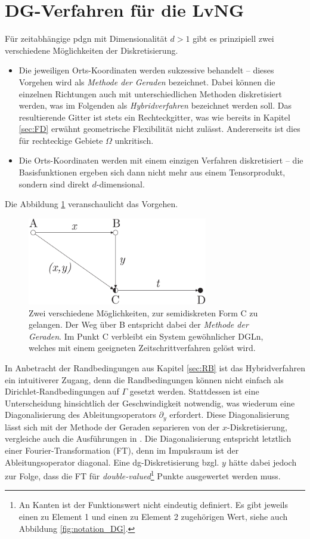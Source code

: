 \section{DG-Verfahren für die LvNG}\label{sec:primal}
Für zeitabhängige \ac{pdg}n mit Dimensionalität $d>1$ gibt es prinzipiell zwei verschiedene Möglichkeiten der Diskretisierung.
\begin{itemize}
  \item Die jeweiligen Orts-Koordinaten werden sukzessive behandelt -- dieses Vorgehen wird als \emph{Methode der Geraden} bezeichnet. Dabei können die einzelnen Richtungen auch mit unterschiedlichen Methoden diskretisiert werden, was im Folgenden als \emph{Hybridverfahren} bezeichnet werden soll. Das resultierende Gitter ist stets ein Rechteckgitter, was wie bereits in Kapitel \ref{sec:FD} erwähnt geometrische Flexibilität nicht zulässt. Andererseits ist dies für rechteckige Gebiete $\Omega$ unkritisch.
  \item Die Orts-Koordinaten werden mit einem einzigen Verfahren diskretisiert -- die Basisfunktionen ergeben sich dann nicht mehr aus einem Tensorprodukt, sondern sind direkt $d$-dimensional.
\end{itemize}
Die Abbildung \ref{fig:methodeDerGeraden} veranschaulicht das Vorgehen.
\begin{figure}
  \centering
  \includegraphics[width=0.7\textwidth]{files/methodeDerGeraden.pdf}
  \caption{Zwei verschiedene Möglichkeiten, zur semidiskreten Form C zu gelangen. Der Weg über B entspricht dabei der \emph{Methode der Geraden}. Im Punkt C verbleibt ein System gewöhnlicher DGLn, welches mit einem geeigneten Zeitschrittverfahren gelöst wird.}
  \label{fig:methodeDerGeraden}
\end{figure}
In Anbetracht der Randbedingungen aus Kapitel \ref{sec:RB} ist das Hybridverfahren ein intuitiverer Zugang, denn die Randbedingungen können nicht einfach als Dirichlet-Randbedingungen auf $\Gamma$ gesetzt werden. Stattdessen ist eine Unterscheidung hinsichtlich der Geschwindigkeit notwendig, was wiederum eine Diagonalisierung des Ableitungsoperators $\partial_y$ erfordert. Diese Diagonalisierung lässt sich mit der Methode der Geraden separieren von der $x$-Diskretisierung, vergleiche auch die Ausführungen in \cite{lukas1}. Die Diagonalisierung entspricht letztlich einer Fourier-Transformation (FT), denn im Impulsraum ist der Ableitungsoperator  diagonal. Eine \ac{dg}-Diskretisierung bzgl. $y$ hätte dabei jedoch zur Folge, dass die FT für \emph{double-valued}\footnote{An Kanten ist der Funktionswert nicht eindeutig definiert. Es gibt jeweils einen zu Element 1 und einen zu Element 2 zugehörigen Wert, siehe auch Abbildung \ref{fig:notation_DG}.} Punkte ausgewertet werden muss.

